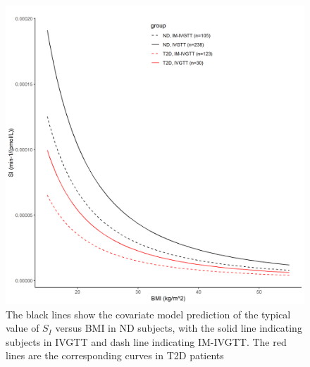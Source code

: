 \documentclass[utf8]{frontiersSCNS} %
\begin{document}
\begin{figure}[h!]
\begin{center}
\includegraphics[width=15cm]{fig4.PNG}
\end{center}
\caption{The black lines show the covariate model prediction of the typical value of $S_I$ versus BMI in ND subjects, with the solid line indicating subjects in IVGTT and dash line indicating IM-IVGTT. The red lines are the corresponding curves in T2D patients}
\label{fig: SI_BMI}
\end{figure}
\end{document}
